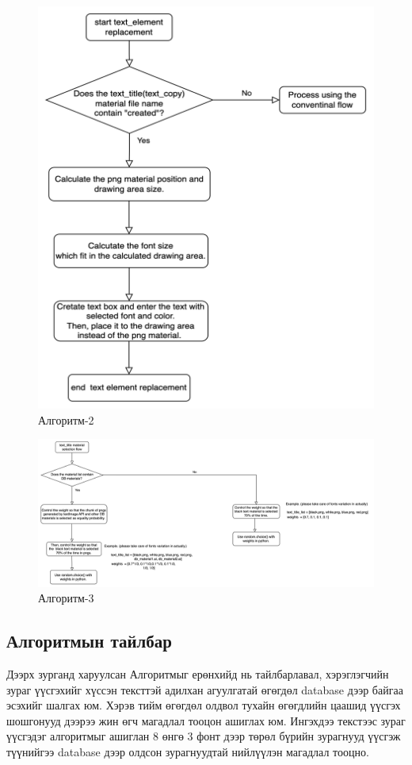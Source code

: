 \begin{figure}
	\centering
	\includegraphics[scale=0.6]{src/pictures/algorithm2.png}
	\caption{Алгоритм-2}
\end{figure}

\begin{figure}
	\centering
	\includegraphics[scale=0.28]{src/pictures/algorithm3.png}
	\caption{Алгоритм-3}
\end{figure}




\subsection{Алгоритмын тайлбар}
Дээрх зурганд харуулсан Алгоритмыг ерөнхийд нь тайлбарлавал, хэрэглэгчийн зураг үүсгэхийг хүссэн тексттэй адилхан агуулгатай өгөгдөл database дээр байгаа эсэхийг шалгах юм. Хэрэв тийм өгөгдөл олдвол тухайн өгөгдлийн цаашид үүсгэх шошгонууд дээрээ жин өгч магадлал тооцон ашиглах юм.
Ингэхдээ текстээс зураг үүсгэдэг алгоритмыг ашиглан 8 өнгө 3 фонт дээр төрөл бүрийн зурагнууд үүсгэж түүнийгээ database дээр олдсон зурагнуудтай нийлүүлэн магадлал тооцно.

